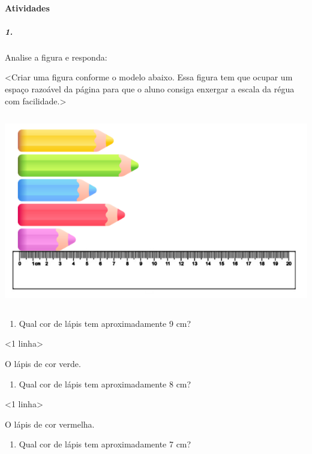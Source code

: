 \paragraph{Atividades }\label{atividades-2}

\subparagraph{1.}\label{section-28}

Analise a figura e responda:

\textless{}Criar uma figura conforme o modelo abaixo. Essa figura tem
que ocupar um espaço razoável da página para que o aluno consiga
enxergar a escala da régua com facilidade.\textgreater{}

\includegraphics[width=5.76042in,height=3.32424in]{media/image42.png}

\begin{enumerate}
\def\labelenumi{\alph{enumi})}
\item
  Qual cor de lápis tem aproximadamente 9 cm?
\end{enumerate}

\textless{}1 linha\textgreater{}

O lápis de cor verde.

\begin{enumerate}
\def\labelenumi{\alph{enumi})}
\item
  Qual cor de lápis tem aproximadamente 8 cm?
\end{enumerate}

\textless{}1 linha\textgreater{}

O lápis de cor vermelha.

\begin{enumerate}
\def\labelenumi{\alph{enumi})}
\item
  Qual cor de lápis tem aproximadamente 7 cm?
\end{enumerate}

